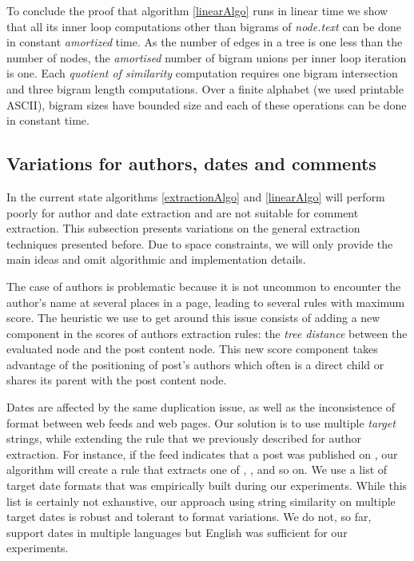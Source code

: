 To conclude the proof that algorithm \ref{linearAlgo} runs in linear time we show that all its inner loop computations other than bigrams of \emph{node.text} can be done in constant \emph{amortized} time. As the number of edges in a tree is one less than the number of nodes, the \emph{amortised} number of bigram unions per inner loop iteration is one. Each \emph{quotient of similarity} computation requires one bigram intersection and three bigram length computations. Over a finite alphabet (we used printable ASCII), bigram sizes have bounded size and each of these operations can be done in constant time.

\subsection{Variations for authors, dates and comments}
In the current state algorithms \ref{extractionAlgo} and \ref{linearAlgo} will perform poorly for author and date extraction and are not suitable for comment extraction. This subsection presents variations on the general extraction techniques presented before. Due to space constraints, we will only provide the main ideas and omit algorithmic and implementation details.

The case of authors is problematic because it is not uncommon to encounter the author's name at several places in a page, leading to several rules with maximum score. The heuristic we use to get around this issue consists of adding a new component in the scores of authors extraction rules: the \emph{tree distance} between the evaluated node and the post content node. This new score component takes advantage of the positioning of post's authors which often is a direct child or shares its parent with the post content node.

Dates are affected by the same duplication issue, as well as the inconsistence of format between web feeds and web pages. Our solution is to use multiple \emph{target} strings, while extending the rule that we previously described for author extraction. For instance, if the feed indicates that a post was published on
, our algorithm will create a rule that extracts one of , ,  and so on. We use a list of  target date formats that was empirically built during our experiments. While this list is certainly not exhaustive, our approach using string similarity on multiple target dates is robust and tolerant to format variations. We do not, so far, support dates in multiple languages but English was sufficient for our experiments.

